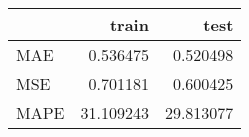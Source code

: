 \begin{tabular}{lrr}
\toprule
{} &      train &       test \\
\midrule
MAE  &   0.536475 &   0.520498 \\
MSE  &   0.701181 &   0.600425 \\
MAPE &  31.109243 &  29.813077 \\
\bottomrule
\end{tabular}
